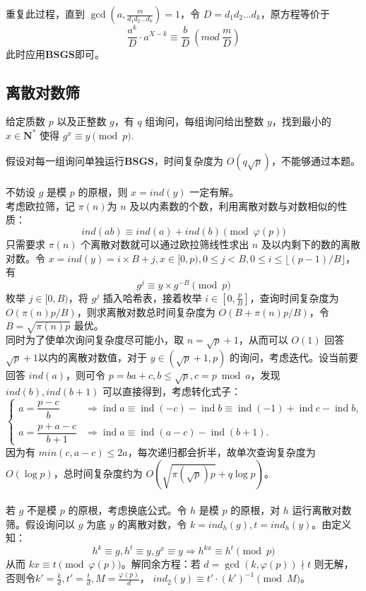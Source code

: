 \documentclass[12pt,a4paper]{article}
\begin{document}
重复此过程，直到 $\displaystyle\gcd(a, \frac{m}{d_1d_2...d_k})=1$，令 $D=d_1d_2...d_k$，原方程等价于
\begin{equation*}
	\displaystyle \frac{a^k}{D}\cdot a^{X-k}\equiv\frac{b}{D}\ (mod\ \frac{m}{D})
\end{equation*}
此时应用\textbf{BSGS}即可。

\newpage
\subsection{离散对数筛}
\begin{mdframed}[leftline=true, linewidth=2pt, linecolor=gray]
	给定质数 $p$ 以及正整数 $g$，有 $q$ 组询问，每组询问给出整数 $y$，找到最小的 $x\in\mathbf{N^*}$ 使得 $g^x\equiv y\pmod p$.
\end{mdframed}
假设对每一组询问单独运行\textbf{BSGS}，时间复杂度为 $O(q\sqrt{p})$，不能够通过本题。\\
\\
不妨设 $g$ 是模 $p$ 的原根，则 $x=ind(y)$ 一定有解。\\
考虑欧拉筛，记 $\pi(n)$为 $n$ 及以内素数的个数，利用离散对数与对数相似的性质：
\begin{equation*}
	ind(ab)\equiv ind(a)+ind(b)\pmod{\varphi(p)}
\end{equation*}
只需要求 $\pi(n)$ 个离散对数就可以通过欧拉筛线性求出 $n$ 及以内剩下的数的离散对数。令 $x=ind(y)=i\times B+j,x\in[0,p),0\le j< B,0\le i\le\lfloor(p-1)/B\rfloor$，有
\begin{equation*}
	g^j\equiv y\times g^{-B}\pmod p
\end{equation*}
枚举 $j\in[0,B)$，将 $g^j$ 插入哈希表，接着枚举 $\displaystyle i\in[0,\frac{p}{B}]$，查询时间复杂度为 $O(\pi(n)p/B)$，则求离散对数总时间复杂度为 $O(B+\pi(n)p/B)$，令 $B=\sqrt{\pi(n)p}$ 最优。\\
同时为了使单次询问复杂度尽可能小，取 $n=\sqrt{p}+1$，从而可以 $O(1)$ 回答 $\sqrt{p}+1$以内的离散对数值，对于 $y\in(\sqrt{p}+1,p)$ 的询问，考虑迭代。设当前要回答 $ind(a)$，则可令 $p=ba+c,b\le\sqrt{p},c=p\bmod a$，发现 $ind(b),ind(b+1)$ 可以直接得到，考虑转化式子：
\[\begin{cases}
	a=\dfrac{p-c}{b} 
	&\Rightarrow \operatorname{ind} a \equiv \operatorname{ind}(-c)-\operatorname{ind} b 
	\equiv \operatorname{ind}(-1)+\operatorname{ind} c-\operatorname{ind} b, \\[6pt]
	a=\dfrac{p+a-c}{b+1} 
	&\Rightarrow \operatorname{ind} a \equiv \operatorname{ind}(a-c)-\operatorname{ind}(b+1).
\end{cases}\]
因为有 $min(c,a−c)\le2a$，每次递归都会折半，故单次查询复杂度为 $O(\log p)$，总时间复杂度约为 $O(\sqrt{\pi(\sqrt{p})p}+q\log{p})$。\\
\\
若 $g$ 不是模 $p$ 的原根，考虑换底公式。令 $h$ 是模 $p$ 的原根，对 $h$ 运行离散对数筛。假设询问以 $g$ 为底 $y$ 的离散对数，令 $k=ind_h(g),t=ind_h(y)$。由定义知：
\begin{equation*}
	h^k\equiv g,h^t\equiv y,g^x\equiv y\Rightarrow h^{kx}\equiv h^t\pmod{p}
\end{equation*}
从而 $kx\equiv t\pmod{\varphi(p)}$。解同余方程：若 $d=\gcd(k,\varphi(p))\nmid t$ 则无解，否则令$\displaystyle k'=\frac{k}{d},t'=\frac{t}{d},M=\frac{\varphi(p)}{d}$， $ind_2(y)\equiv t'\cdot (k')^{-1}\pmod M$。
\end{document}
